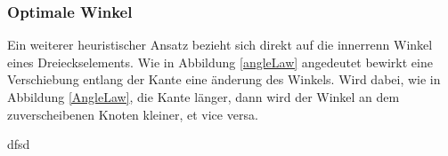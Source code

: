   \subsubsection{Optimale Winkel}
    Ein weiterer heuristischer Ansatz bezieht sich direkt auf die innerrenn Winkel eines Dreieckselements. 
    Wie in Abbildung \ref{angleLaw} angedeutet bewirkt eine Verschiebung entlang der Kante eine änderung des Winkels.
    Wird dabei, wie in Abbildung \ref{AngleLaw}, die Kante länger, dann wird der Winkel an dem zuverscheibenen Knoten kleiner, et vice versa. 
    




      

  \begin{fazit}
  dfsd
  \end{fazit}

